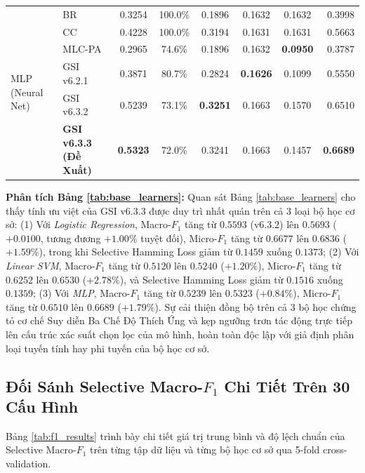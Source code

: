 \documentclass[11pt,a4paper]{article}
\begin{document}
\begin{table}[H]
{\begin{tabular}{llcccccr}
\midrule
\multirow{6}{*}{MLP (Neural Net)} & BR & 0.3254 & 100.0\% & 0.1896 & 0.1632 & 0.1632 & 0.3998 \\
 & CC & 0.4228 & 100.0\% & 0.3194 & 0.1631 & 0.1631 & 0.5663 \\
 & MLC-PA & 0.2965 & 74.6\% & 0.1896 & 0.1632 & \textbf{0.0950} & 0.3787 \\
 & GSI v6.2.1 & 0.3871 & 80.7\% & 0.2824 & \textbf{0.1626} & 0.1099 & 0.5550 \\
 & GSI v6.3.2 & 0.5239 & 73.1\% & \textbf{0.3251} & 0.1663 & 0.1570 & 0.6510 \\
 & \textbf{GSI v6.3.3 (Đề Xuất)} & \textbf{0.5323} & 72.0\% & 0.3241 & 0.1663 & 0.1457 & \textbf{0.6689} \\
\midrule
\bottomrule
\end{tabular}%
}
\end{table}

\noindent\textbf{Phân tích Bảng \ref{tab:base_learners}:}
Quan sát Bảng \ref{tab:base_learners} cho thấy tính ưu việt của GSI v6.3.3 được duy trì nhất quán trên cả 3 loại bộ học cơ sở: (1) Với \textit{Logistic Regression}, Macro-$F_1$ tăng từ $0.5593$ (v6.3.2) lên $0.5693$ ($+0.0100$, tương đương $+1.00\%$ tuyệt đối), Micro-$F_1$ tăng từ $0.6677$ lên $0.6836$ ($+1.59\%$), trong khi Selective Hamming Loss giảm từ $0.1459$ xuống $0.1373$; (2) Với \textit{Linear SVM}, Macro-$F_1$ tăng từ $0.5120$ lên $0.5240$ ($+1.20\%$), Micro-$F_1$ tăng từ $0.6252$ lên $0.6530$ ($+2.78\%$), và Selective Hamming Loss giảm từ $0.1516$ xuống $0.1359$; (3) Với \textit{MLP}, Macro-$F_1$ tăng từ $0.5239$ lên $0.5323$ ($+0.84\%$), Micro-$F_1$ tăng từ $0.6510$ lên $0.6689$ ($+1.79\%$). Sự cải thiện đồng bộ trên cả 3 bộ học chứng tỏ cơ chế Suy diễn Ba Chế Độ Thích Ứng và kẹp ngưỡng trơn tác động trực tiếp lên cấu trúc xác suất chọn lọc của mô hình, hoàn toàn độc lập với giả định phân loại tuyến tính hay phi tuyến của bộ học cơ sở.

\subsection{Đối Sánh Selective Macro-\texorpdfstring{$F_1$}{F1} Chi Tiết Trên 30 Cấu Hình}
Bảng \ref{tab:f1_results} trình bày chi tiết giá trị trung bình và độ lệch chuẩn của Selective Macro-$F_1$ trên từng tập dữ liệu và từng bộ học cơ sở qua 5-fold cross-validation.
\end{document}
